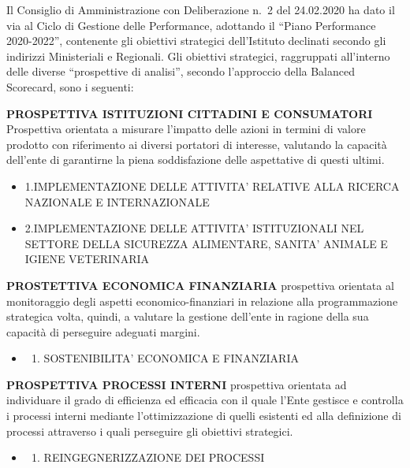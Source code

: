 \documentclass[
  12pt,
]{article}
\providecommand{\tightlist}{%
  \setlength{\itemsep}{0pt}\setlength{\parskip}{0pt}}
\begin{document}
Il Consiglio di Amministrazione con Deliberazione n.~2 del 24.02.2020 ha
dato il via al Ciclo di Gestione delle Performance, adottando il ``Piano
Performance 2020-2022'', contenente gli obiettivi strategici
dell'Istituto declinati secondo gli indirizzi Ministeriali e Regionali.
Gli obiettivi strategici, raggruppati all'interno delle diverse
``prospettive di analisi'', secondo l'approccio della Balanced
Scorecard, sono i seguenti:

\textbf{PROSPETTIVA ISTITUZIONI CITTADINI E CONSUMATORI} Prospettiva
orientata a misurare l'impatto delle azioni in termini di valore
prodotto con riferimento ai diversi portatori di interesse, valutando la
capacità dell'ente di garantirne la piena soddisfazione delle
aspettative di questi ultimi.

\begin{itemize}
\tightlist
\item
  1.IMPLEMENTAZIONE DELLE ATTIVITA' RELATIVE ALLA RICERCA NAZIONALE E
  INTERNAZIONALE
\item
  2.IMPLEMENTAZIONE DELLE ATTIVITA' ISTITUZIONALI NEL SETTORE DELLA
  SICUREZZA ALIMENTARE, SANITA' ANIMALE E IGIENE VETERINARIA
\end{itemize}

\textbf{PROSTETTIVA ECONOMICA FINANZIARIA} prospettiva orientata al
monitoraggio degli aspetti economico-finanziari in relazione alla
programmazione strategica volta, quindi, a valutare la gestione
dell'ente in ragione della sua capacità di perseguire adeguati margini.

\begin{itemize}
\item
  \begin{enumerate}
  \def\labelenumi{\arabic{enumi}.}
  \setcounter{enumi}{2}
  \tightlist
  \item
    SOSTENIBILITA' ECONOMICA E FINANZIARIA
  \end{enumerate}
\end{itemize}

\textbf{PROSPETTIVA PROCESSI INTERNI} prospettiva orientata ad
individuare il grado di efficienza ed efficacia con il quale l'Ente
gestisce e controlla i processi interni mediante l'ottimizzazione di
quelli esistenti ed alla definizione di processi attraverso i quali
perseguire gli obiettivi strategici.

\begin{itemize}
\item
  \begin{enumerate}
  \def\labelenumi{\arabic{enumi}.}
  \setcounter{enumi}{3}
  \tightlist
  \item
    REINGEGNERIZZAZIONE DEI PROCESSI
  \end{enumerate}
\end{itemize}
\end{document}
